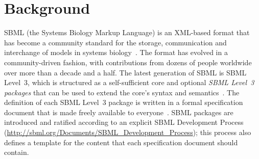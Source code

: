 \documentclass{bmcart}
\begin{document}
\begin{frontmatter}
\begin{abstractbox}

\end{abstractbox}
%

\end{frontmatter}



\section*{Background}

SBML (the Systems Biology Markup Language) is an XML-based format that has become a community standard for the storage, communication and interchange of models in systems biology~\cite{hucka2003the, waltemath2014meeting}.  The format has evolved in a community-driven fashion, with contributions from dozens of people worldwide over more than a decade and a half.  The latest generation of SBML is SBML Level~3, which is structured as a self-sufficient core and optional \emph{SBML Level~3 packages} that can be used to extend the core's syntax and semantics~\cite{hucka2015the}.  The definition of each SBML Level~3 package is written in a formal specification document that is made freely available to everyone~\cite{schreiber2015specifications, schreiber2016specifications}.  SBML packages are introduced and ratified according to an explicit SBML Development Process (\url{http://sbml.org/Documents/SBML_Development_Process}); this process also defines a template for the content that each specification document should contain.
\end{document}
